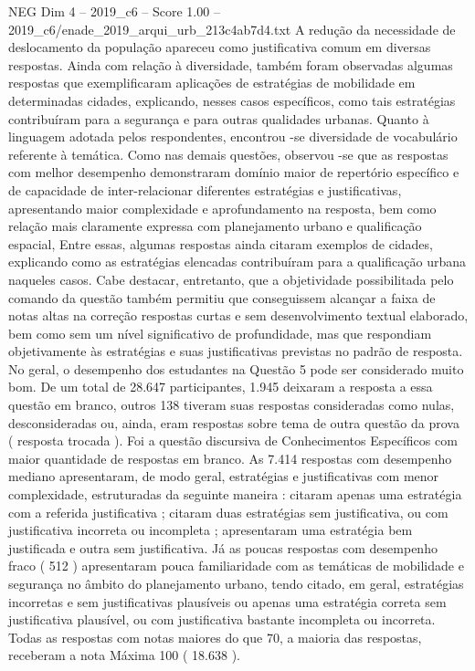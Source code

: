 \begin{textsample}{NEG Dim 4 – 2019\_c6 – Score 1.00 – 2019\_c6/enade\_2019\_arqui\_urb\_213c4ab7d4.txt}
A redução da necessidade de deslocamento da população apareceu como justificativa comum em diversas respostas.
Ainda com relação à diversidade, também foram observadas algumas respostas que exemplificaram aplicações de estratégias de mobilidade em determinadas cidades, explicando, nesses casos específicos, como tais estratégias contribuíram para a segurança e para outras qualidades urbanas.
Quanto à linguagem adotada pelos respondentes, encontrou -se diversidade de vocabulário referente à temática.
Como nas demais questões, observou -se que as respostas com melhor desempenho demonstraram domínio maior de repertório específico e de capacidade de inter-relacionar diferentes estratégias e justificativas, apresentando maior complexidade e aprofundamento na resposta, bem como relação mais claramente expressa com planejamento urbano e qualificação espacial, Entre essas, algumas respostas ainda citaram exemplos de cidades, explicando como as estratégias elencadas contribuíram para a qualificação urbana naqueles casos.
Cabe destacar, entretanto, que a objetividade possibilitada pelo comando da questão também permitiu que conseguissem alcançar a faixa de notas altas na correção respostas curtas e sem desenvolvimento textual elaborado, bem como sem um nível significativo de profundidade, mas que respondiam objetivamente às estratégias e suas justificativas previstas no padrão de resposta.
No geral, o desempenho dos estudantes na Questão 5 pode ser considerado muito bom.
De um total de 28.647 participantes, 1.945 deixaram a resposta a essa questão em branco, outros 138 tiveram suas respostas consideradas como nulas, desconsideradas ou, ainda, eram respostas sobre tema de outra questão da prova ( resposta trocada ).
Foi a questão discursiva de Conhecimentos Específicos com maior quantidade de respostas em branco.
As 7.414 respostas com desempenho mediano apresentaram, de modo geral, estratégias e justificativas com menor complexidade, estruturadas da seguinte maneira : citaram apenas uma estratégia com a referida justificativa ; citaram duas estratégias sem justificativa, ou com justificativa incorreta ou incompleta ; apresentaram uma estratégia bem justificada e outra sem justificativa.
Já as poucas respostas com desempenho fraco ( 512 ) apresentaram pouca familiaridade com as temáticas de mobilidade e segurança no âmbito do planejamento urbano, tendo citado, em geral, estratégias incorretas e sem justificativas plausíveis ou apenas uma estratégia correta sem justificativa plausível, ou com justificativa bastante incompleta ou incorreta.
Todas as respostas com notas maiores do que 70, a maioria das respostas, receberam a nota Máxima 100 ( 18.638 ).

\end{textsample}
